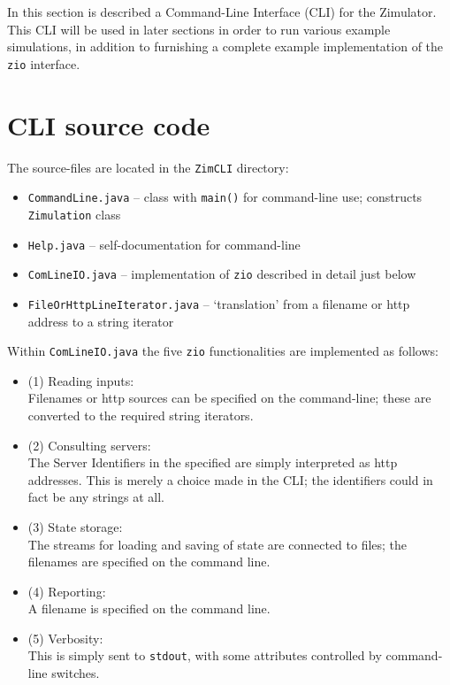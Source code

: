 
In this section is described a Command-Line Interface (CLI) for the
Zimulator. This CLI will be used in later sections in order to run
various example simulations, in addition to furnishing a complete
example implementation of the {\tt zio} interface.

\section{CLI source code}
The source-files are located in the {\tt ZimCLI} directory:
\begin{itemize}
\item {\tt CommandLine.java} -- class with {\tt main()} for command-line use; constructs {\tt Zimulation} class
\item {\tt Help.java} -- self-documentation for command-line
\item {\tt ComLineIO.java} -- implementation of {\tt zio} described in detail just below
\item {\tt FileOrHttpLineIterator.java} -- `translation' from a filename or http address to a string iterator
\end{itemize}

Within {\tt ComLineIO.java} the five {\tt zio} functionalities are implemented as follows:
\begin{itemize}
\item (1) Reading inputs:\\
  Filenames or http sources can be specified on the command-line; these are converted to the required string iterators.
\item (2) Consulting servers:\\
  The Server Identifiers in the specified  are simply
  interpreted as http addresses. This is merely a choice made in the
  CLI; the identifiers could in fact be any strings at all.
\item (3) State storage:\\
  The streams for loading and saving of state are connected to files; the filenames are specified on the command line.
\item (4) Reporting:\\
  A filename is specified on the command line.
\item (5) Verbosity:\\
  This is simply sent to {\tt stdout}, with some attributes controlled by command-line switches.
\end{itemize}

